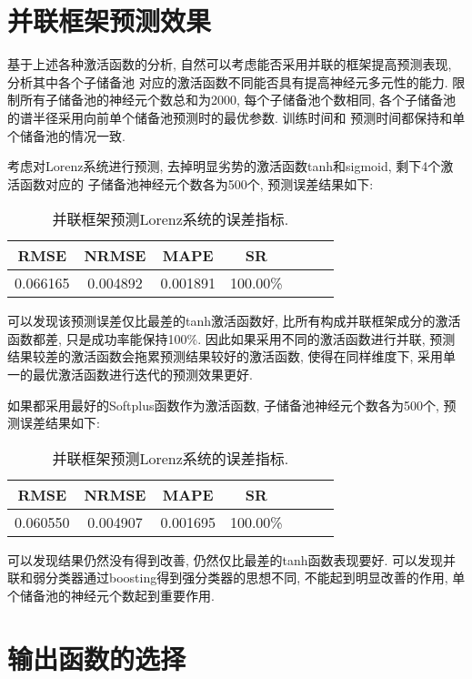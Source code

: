 \documentclass[notitlepage,cs4size,punct,oneside]{ctexrep}
\numberwithin{equation}{chapter}
\theoremstyle{mystyle}
\begin{document}
\clearpage

\section{并联框架预测效果}
基于上述各种激活函数的分析, 自然可以考虑能否采用并联的框架提高预测表现, 分析其中各个子储备池
对应的激活函数不同能否具有提高神经元多元性的能力. 限制所有子储备池的神经元个数总和为2000, 
每个子储备池个数相同, 各个子储备池的谱半径采用向前单个储备池预测时的最优参数. 训练时间和
预测时间都保持和单个储备池的情况一致. 

考虑对Lorenz系统进行预测, 去掉明显劣势的激活函数tanh和sigmoid, 剩下4个激活函数对应的
子储备池神经元个数各为500个, 预测误差结果如下:
\begin{table}[htbp]\centering
    \caption{并联框架预测Lorenz系统的误差指标.}
    \begin{tabular}{ccccccc}
    \hline\hline
    RMSE & NRMSE & MAPE & SR \\
    \hline
    0.066165   & 0.004892 & 0.001891 & 100.00\% \\
    \hline\hline
    \end{tabular}
\end{table}

可以发现该预测误差仅比最差的tanh激活函数好, 比所有构成并联框架成分的激活函数都差, 
只是成功率能保持100\%. 因此如果采用不同的激活函数进行并联, 预测结果较差的激活函数会拖累预测结果较好的激活函数, 
使得在同样维度下, 采用单一的最优激活函数进行迭代的预测效果更好. 

如果都采用最好的Softplus函数作为激活函数, 子储备池神经元个数各为500个, 
预测误差结果如下:
\begin{table}[htbp]\centering
    \caption{并联框架预测Lorenz系统的误差指标.}
    \begin{tabular}{ccccccc}
    \hline\hline
    RMSE & NRMSE & MAPE & SR \\
    \hline
    0.060550 & 0.004907 & 0.001695 & 100.00\% \\
    \hline\hline
    \end{tabular}
\end{table}

可以发现结果仍然没有得到改善, 仍然仅比最差的tanh函数表现要好. 
可以发现并联和弱分类器通过boosting得到强分类器的思想不同, 
不能起到明显改善的作用, 单个储备池的神经元个数起到重要作用. 

\section{输出函数的选择}
\end{document}
